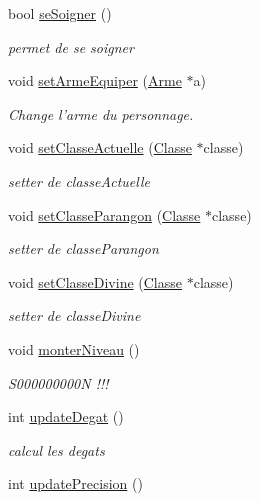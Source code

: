 \begin{DoxyCompactItemize}
bool \hyperlink{classPersonnage_a2c731ad41a9d720df7d818a6705a3f3c}{se\-Soigner} ()
\begin{DoxyCompactList}\small\item\em permet de se soigner \end{DoxyCompactList}\item 
void \hyperlink{classPersonnage_a524d0e177e9dfd472189ef60bb9f7828}{set\-Arme\-Equiper} (\hyperlink{classArme}{Arme} $\ast$a)
\begin{DoxyCompactList}\small\item\em Change l'arme du personnage. \end{DoxyCompactList}\item 
void \hyperlink{classPersonnage_a356317bcbf60de8f579a7816d3112f19}{set\-Classe\-Actuelle} (\hyperlink{classClasse}{Classe} $\ast$classe)
\begin{DoxyCompactList}\small\item\em setter de classe\-Actuelle \end{DoxyCompactList}\item 
void \hyperlink{classPersonnage_a77a2868f0ebe1747adb0395ad8c49d4e}{set\-Classe\-Parangon} (\hyperlink{classClasse}{Classe} $\ast$classe)
\begin{DoxyCompactList}\small\item\em setter de classe\-Parangon \end{DoxyCompactList}\item 
void \hyperlink{classPersonnage_a2c9b4bdc2a17ee4b53ba1df442948adb}{set\-Classe\-Divine} (\hyperlink{classClasse}{Classe} $\ast$classe)
\begin{DoxyCompactList}\small\item\em setter de classe\-Divine \end{DoxyCompactList}\item 
void \hyperlink{classPersonnage_a89bee8eb8c2c0e6b7b47f78a93c6d96a}{monter\-Niveau} ()
\begin{DoxyCompactList}\small\item\em S000000000\-N !!! \end{DoxyCompactList}\item 
int \hyperlink{classPersonnage_a2724dcc386b3858caec89c0a76977d11}{update\-Degat} ()
\begin{DoxyCompactList}\small\item\em calcul les degats \end{DoxyCompactList}\item 
int \hyperlink{classPersonnage_abfe657430f5cf3c4d88e66fba39f574b}{update\-Precision} ()

\end{DoxyCompactItemize}

